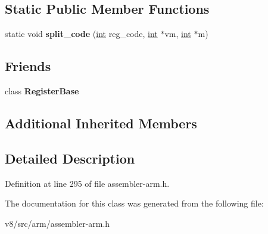 \subsection*{Static Public Member Functions}
\begin{DoxyCompactItemize}
\item 
\mbox{\label{classv8_1_1internal_1_1QwNeonRegister_aab5a2b703dc7590fbd27fd4889ec68c3}} 
static void {\bfseries split\+\_\+code} (\mbox{\hyperlink{classint}{int}} reg\+\_\+code, \mbox{\hyperlink{classint}{int}} $\ast$vm, \mbox{\hyperlink{classint}{int}} $\ast$m)
\end{DoxyCompactItemize}
\subsection*{Friends}
\begin{DoxyCompactItemize}
\item 
\mbox{\label{classv8_1_1internal_1_1QwNeonRegister_a762c32bfc1b920b5ead6f1c087b4a400}} 
class {\bfseries Register\+Base}
\end{DoxyCompactItemize}
\subsection*{Additional Inherited Members}


\subsection{Detailed Description}


Definition at line 295 of file assembler-\/arm.\+h.



The documentation for this class was generated from the following file\+:\begin{DoxyCompactItemize}
\item 
v8/src/arm/assembler-\/arm.\+h\end{DoxyCompactItemize}
